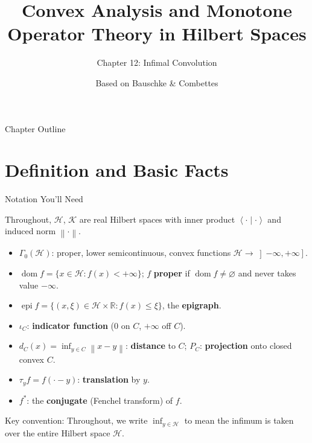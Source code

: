 \documentclass[aspectratio=169,10pt]{beamer}
\title[Convex Analysis \& MOT -- Ch.12]{Convex Analysis and Monotone Operator Theory in Hilbert Spaces}
\subtitle{Chapter 12: Infimal Convolution}
\author{Based on Bauschke \& Combettes}
\institute{CMS Books in Mathematics, Springer, 2nd ed., 2017}
\date{}
\newcommand{\cH}{\mathcal{H}}
\newcommand{\cK}{\mathcal{K}}
\newcommand{\R}{\mathbb{R}}
\newcommand{\norm}[1]{\left\|#1\right\|}
\newcommand{\inner}[2]{\left\langle #1 \mid #2 \right\rangle}
\newcommand{\dom}{\operatorname{dom}}
\newcommand{\epi}{\operatorname{epi}}
\begin{document}

\begin{frame}
  \titlepage
\end{frame}

\begin{frame}{Chapter Outline}
  \tableofcontents
\end{frame}

\section{Definition and Basic Facts}

\begin{frame}[allowframebreaks]{Notation You'll Need}

  Throughout, $\cH$, $\cK$ are real Hilbert spaces with inner product
  $\inner{\cdot}{\cdot}$ and induced norm $\norm{\cdot}$.

  \begin{itemize}
    \item $\Gamma_0(\cH)$: proper, lower semicontinuous, convex functions
      $\cH\to\left]-\infty,+\infty\right]$.
    \item $\dom f=\{x\in\cH: f(x)<+\infty\}$; $f$ \textbf{proper} if
      $\dom f\ne\varnothing$ and never takes value $-\infty$.
    \item $\epi f=\{(x,\xi)\in\cH\times\R: f(x)\le\xi\}$, the \textbf{epigraph}.
    \item $\iota_C$: \textbf{indicator function} ($0$ on $C$, $+\infty$ off $C$).
    \item $d_C(x)=\inf_{y\in C}\norm{x-y}$: \textbf{distance} to $C$;
      $P_C$: \textbf{projection} onto closed convex $C$.
    \item $\tau_y f = f(\cdot - y)$: \textbf{translation} by $y$.
    \item $f^*$: the \textbf{conjugate} (Fenchel transform) of $f$.
  \end{itemize}

  \framebreak

  Key convention: Throughout, we write $\inf_{y \in \cH}$ to mean the
  infimum is taken over the entire Hilbert space $\cH$.

\end{frame}
\end{document}
